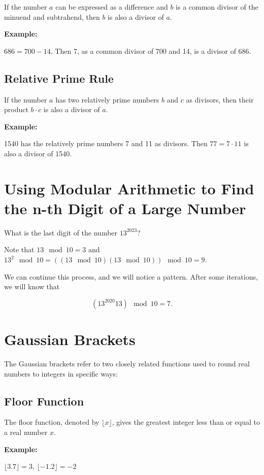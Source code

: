 If the number \(a\) can be expressed as a difference and \(b\) is a common divisor of the minuend
and subtrahend, then \(b\) is also a divisor of \(a\).

\textbf{Example:}

\( 686 = 700 - 14 \). Then 7, as a common divisor of 700 and 14, is a divisor of 686.

\subsection*{Relative Prime Rule}

If the number \(a\) has two relatively prime numbers \(b\) and \( c \) as divisors, then their
product \( b \cdot c \) is also a divisor of \(a\).

\textbf{Example:}

1540 has the relatively prime numbers 7 and 11 as divisors. Then \( 77 = 7 \cdot 11 \) is also a divisor
of 1540.

\section{Using Modular Arithmetic to Find the n-th Digit of a Large Number}

What is the last digit of the number \(13^{2023}\)?

Note that \(13 \mod 10 = 3\) and  \(13^2 \mod 10 =  ((13 \mod 10)  (13\mod 10)) \mod 10 = 9 \).

We can continue this process, and we will notice a pattern. After some iterations, we will know that

\[
	(13^{2020} 13) \mod 10 = 7.
\]

\section{Gaussian Brackets}

The Gaussian brackets refer to two closely related functions used to round real numbers to integers in specific ways:

\subsection{Floor Function}

The floor function, denoted by \(\lfloor x \rfloor\), gives the greatest integer less than or equal
to a real number \(x\).

\textbf{Example:}

\(\lfloor 3.7 \rfloor = 3\), \(\lfloor -1.2 \rfloor = -2\)

